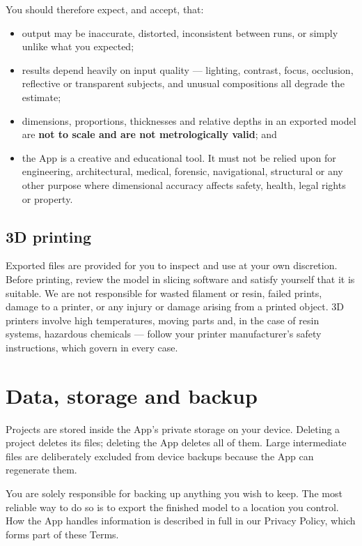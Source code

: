 \documentclass[11pt]{article}
\begin{document}
You should therefore expect, and accept, that:

\begin{itemize}
  \item output may be inaccurate, distorted, inconsistent between runs, or simply
        unlike what you expected;
  \item results depend heavily on input quality — lighting, contrast, focus,
        occlusion, reflective or transparent subjects, and unusual compositions all
        degrade the estimate;
  \item dimensions, proportions, thicknesses and relative depths in an exported model
        are \textbf{not to scale and are not metrologically valid}; and
  \item the App is a creative and educational tool. It must not be relied upon for
        engineering, architectural, medical, forensic, navigational, structural or any
        other purpose where dimensional accuracy affects safety, health, legal rights
        or property.
\end{itemize}

\subsection{3D printing}
Exported files are provided for you to inspect and use at your own discretion. Before
printing, review the model in slicing software and satisfy yourself that it is suitable.
We are not responsible for wasted filament or resin, failed prints, damage to a printer,
or any injury or damage arising from a printed object. 3D printers involve high
temperatures, moving parts and, in the case of resin systems, hazardous chemicals —
follow your printer manufacturer's safety instructions, which govern in every case.

\section{Data, storage and backup}

Projects are stored inside the App's private storage on your device. Deleting a project
deletes its files; deleting the App deletes all of them. Large intermediate files are
deliberately excluded from device backups because the App can regenerate them.

You are solely responsible for backing up anything you wish to keep. The most reliable
way to do so is to export the finished model to a location you control. How the App
handles information is described in full in our Privacy Policy, which forms part of
these Terms.
\end{document}
